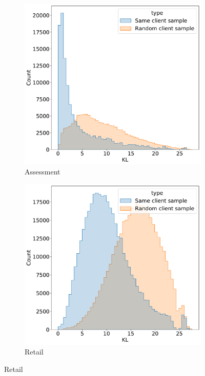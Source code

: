 \documentclass{article}
\begin{document}
\begin{figure}
\begin{subfigure}{0.5\linewidth}
  \end{subfigure}
  \begin{subfigure}{0.5\linewidth}
    \caption{Assessment}
    \includegraphics[width=\linewidth]{figures/kl_dis_assessment.pdf}
  \end{subfigure}%
  \begin{subfigure}{0.5\linewidth}
    \caption{Retail}
    \includegraphics[width=\linewidth]{figures/kl_dis_retail.pdf}

\end{subfigure}
\end{figure}
\end{document}
